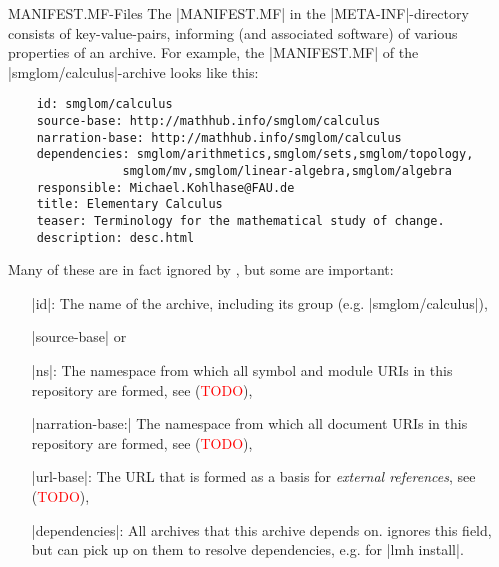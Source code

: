 \begin{sfragment}{MANIFEST.MF-Files}
  The |MANIFEST.MF| in the |META-INF|-directory consists of key-value-pairs, informing
  \sTeX (and associated software) of various properties of an archive. For example, the
  |MANIFEST.MF| of the |smglom/calculus|-archive looks like this:

    \begin{framed}
        \begin{verbatim}
    id: smglom/calculus
    source-base: http://mathhub.info/smglom/calculus
    narration-base: http://mathhub.info/smglom/calculus
    dependencies: smglom/arithmetics,smglom/sets,smglom/topology,
                smglom/mv,smglom/linear-algebra,smglom/algebra
    responsible: Michael.Kohlhase@FAU.de
    title: Elementary Calculus
    teaser: Terminology for the mathematical study of change. 
    description: desc.html
        \end{verbatim}
    \end{framed}

    Many of these are in fact ignored by \sTeX, but some are important:
    \begin{itemize}
        \item[|id|:] The name of the archive, including its group (e.g. |smglom/calculus|),
        \item[|source-base|] or
        \item[|ns|:] The namespace from which all symbol and module URIs
            in this repository are formed, see (\textcolor{red}{TODO}),
        \item[|narration-base:|] The namespace from which all document
            URIs in this repository are formed, see (\textcolor{red}{TODO}),
        \item[|url-base|:] The URL that is formed as a basis for \emph{external references},
            see (\textcolor{red}{TODO}),
        \item[|dependencies|:] All archives that this archive depends on. \sTeX ignores
            this field, but \mmt can pick up on them to resolve dependencies,
            e.g. for |lmh install|.  
    \end{itemize}

\end{sfragment}

